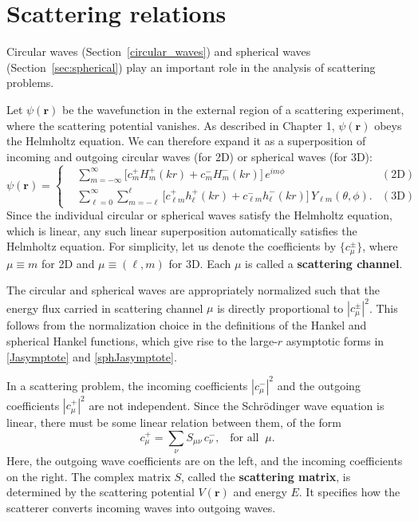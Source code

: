 \documentclass[pra,12pt]{revtex4}
\begin{document}
\section{Scattering relations}
\label{sec:scattering}

Circular waves (Section~\ref{circular_waves}) and spherical waves
(Section~\ref{sec:spherical}) play an important role in the analysis
of scattering problems.

Let $\psi(\mathbf{r})$ be the wavefunction in the external region of a
scattering experiment, where the scattering potential vanishes.  As
described in Chapter 1, $\psi(\mathbf{r})$ obeys the Helmholtz
equation.  We can therefore expand it as a superposition of incoming
and outgoing circular waves (for 2D) or spherical waves (for 3D):
\begin{equation}
  \psi(\mathbf{r}) =
  \left\{
  \begin{aligned}
    &\sum_{m=-\infty}^\infty
    \Big[c_m^+ H_m^+(kr) + c_m^- H_m^-(kr)\Big] \, e^{im\phi}
    & (\textrm{2D})
    \\
    &\sum_{\ell = 0}^\infty \sum_{m = - \ell}^\ell
    \Big[c_{\ell m}^+ h_\ell^+(kr) + c_{\ell m}^- h_\ell^-(kr)\Big] \,
    Y_{\ell m}(\theta, \phi). & (\textrm{3D})
  \end{aligned}\right.
  \label{psirdecomp}
\end{equation}
Since the individual circular or spherical waves satisfy the Helmholtz
equation, which is linear, any such linear superposition automatically
satisfies the Helmholtz equation.  For simplicity, let us denote the
coefficients by $\{c_\mu^\pm\}$, where $\mu \equiv m$ for 2D and $\mu
\equiv (\ell, m)$ for 3D.  Each $\mu$ is called a \textbf{scattering
  channel}.

The circular and spherical waves are appropriately normalized such
that the energy flux carried in scattering channel $\mu$ is directly
proportional to $|c_\mu^\pm|^2$.  This follows from the normalization
choice in the definitions of the Hankel and spherical Hankel
functions, which give rise to the large-$r$ asymptotic forms in
\eqref{Jasymptote} and \eqref{sphJasymptote}.

In a scattering problem, the incoming coefficients $|c_\mu^-|^2$ and
the outgoing coefficients $|c_\mu^+|^2$ are not independent.  Since
the Schr\"odinger wave equation is linear, there must be some linear
relation between them, of the form
\begin{equation}
  c_{\mu}^+ = \sum_{\nu} S_{\mu \nu} \, c_{\nu}^-, \;\;\;\text{for all}\;\;\mu.
  \label{srelation}
\end{equation}
Here, the outgoing wave coefficients are on the left, and the incoming
coefficients on the right.  The complex matrix $S$, called the
\textbf{scattering matrix}, is determined by the scattering potential
$V(\mathbf{r})$ and energy $E$.  It specifies how the scatterer
converts incoming waves into outgoing waves.
\end{document}
